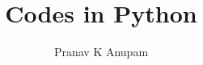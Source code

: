 \documentclass{article}
\title{Codes in Python}
\author{Pranav K Anupam}
\begin{document}
\maketitle
\inputminted[linenos]{python}{loop.py}
\inputminted[linenos]{c}{fac.c}
\end{document}
